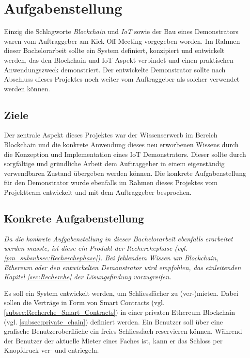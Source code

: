 \chapter{Aufgabenstellung}
\label{cha:Aufgabenstellung}
Einzig die Schlagworte \emph{Blockchain} und \emph{\acrfull{IoT}} sowie der Bau eines Demonstrators waren vom Auftraggeber am Kick-Off Meeting vorgegeben worden. Im Rahmen dieser Bachelorarbeit sollte ein System definiert, konzipiert und entwickelt werden, das den Blockchain und IoT Aspekt verbindet und einen praktischen Anwendungszweck demonstriert. Der entwickelte Demonstrator sollte nach Abschluss dieses Projektes noch weiter vom Auftraggeber als solcher verwendet werden können.

\section{Ziele}
\label{sec:Ziele}
Der zentrale Aspekt dieses Projektes war der Wissenserwerb im Bereich Blockchain und die konkrete Anwendung dieses neu erworbenen Wissens durch die Konzeption und Implementation eines IoT Demonstrators. Dieser sollte durch sorgfältige und gründliche Arbeit dem Auftraggeber in einem eigenständig verwendbaren Zustand übergeben werden können. Die konkrete Aufgabenstellung für den Demonstrator wurde ebenfalls im Rahmen dieses Projektes vom Projektteam entwickelt und mit dem Auftraggeber besprochen.

\section{Konkrete Aufgabenstellung}
\label{sec:Konkrete_Aufgabenstellung}
\emph{Da die konkrete Aufgabenstellung in dieser Bachelorarbeit ebenfalls erarbeitet werden musste, ist diese ein Produkt der Recherchephase (vgl. \ref{pm_subsubsec:Recherchephase}). Bei fehlendem Wissen um Blockchain, Ethereum oder den entwickelten Demonstrator wird empfohlen, das einleitenden Kapitel \ref{sec:Recherche}  der Lösungsfindung vorzugreifen.}

Es soll ein System entwickelt werden, um Schliessfächer zu (ver-)mieten. Dabei sollen die Verträge in Form von Smart Contracts (vgl. \ref{subsec:Recherche_Smart_Contracts}) in einer privaten Ethereum Blockchain (vgl. \ref{subsec:private_chain}) definiert werden. Ein Benutzer soll über eine grafische Benutzeroberfläche ein freies Schliessfach reservieren können. Während der Benutzer der aktuelle Mieter eines Faches ist, kann er das Schloss per Knopfdruck ver- und entriegeln.


